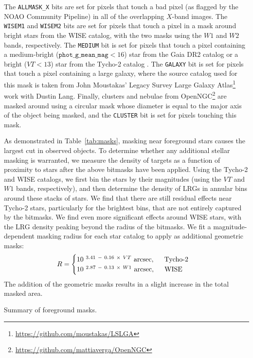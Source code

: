 \documentclass[a4paper,usenatbib]{mnras}
\begin{document}
The \texttt{ALLMASK\_X} bits are set for pixels that touch a bad pixel (as flagged by the NOAO Community Pipeline) in all of the overlapping $X$-band images. The \texttt{WISEM1} and \texttt{WISEM2} bits are set for pixels that touch a pixel in a mask around bright stars from the WISE catalog, with the two masks using the $W1$ and $W2$ bands, respectively. The \texttt{MEDIUM} bit is set for pixels that touch a pixel containing a medium-bright ($\texttt{phot\_g\_mean\_mag} < 16$) star from the Gaia DR2 catalog \citep{GaiaDR2} or a bright ($VT < 13$) star from the Tycho-2 catalog \citep{Hog00}. The \texttt{GALAXY} bit is set for pixels that touch a pixel containing a large galaxy, where the source catalog used for this mask is taken from John Moustakas' Legacy Survey Large Galaxy Atlas\footnote{\url{https://github.com/moustakas/LSLGA}} work with Dustin Lang. Finally, clusters and nebulae from OpenNGC\footnote{\url{https://github.com/mattiaverga/OpenNGC}} are masked around using a circular mask whose diameter is equal to the major axis of the object being masked, and the \texttt{CLUSTER} bit is set for pixels touching this mask.

As demonstrated in Table~\ref{tab:masks}, masking near foreground stars causes the largest cut in observed objects. To determine whether any additional stellar masking is warranted, we measure the density of targets as a function of proximity to stars after the above bitmasks have been applied. Using the Tycho-2 and WISE catalogs, we first bin the stars by their magnitudes (using the $VT$ and $W1$ bands, respectively), and then determine the density of LRGs in annular bins around these stacks of stars. We find that there are still residual effects near Tycho-2 stars, particularly for the brightest bins, that are not entirely captured by the bitmasks. We find even more significant effects around WISE stars, with the LRG density peaking beyond the radius of the bitmasks. We fit a magnitude-dependent masking radius for each star catalog to apply as additional geometric masks: 
%
\begin{align}\label{eq:mr-veto}
R = 
\begin{cases}
    10^{\ 3.41 \ - \ 0.16 \ \times \ VT} \ \text{arcsec}, \hspace{0.5cm} \text{Tycho-2} \\
    10^{\ 2.87 \ - \ 0.13 \ \times \ W1} \ \text{arcsec}, 
    \hspace{0.5cm} \text{WISE}
\end{cases}
\end{align}
%
The addition of the geometric masks results in a slight increase in the total masked area.
%
\begin{table}
    
    \caption{Summary of foreground masks.}
    \label{tab:masks}
\end{table}
\end{document}
